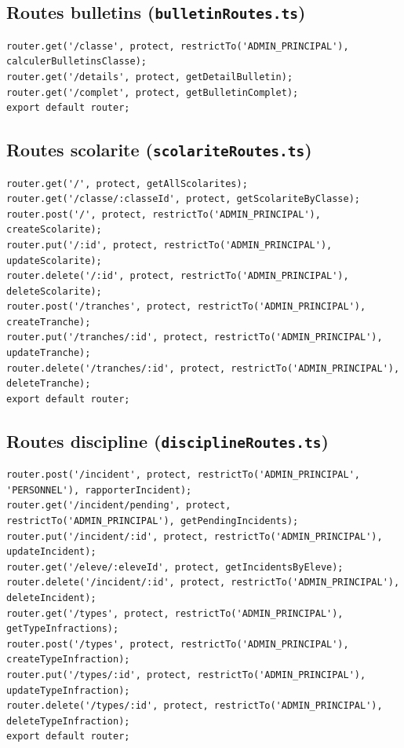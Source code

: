 \documentclass[12pt,a4paper]{article}
\begin{document}
\subsection{Routes bulletins (\texttt{bulletinRoutes.ts})}

\begin{lstlisting}[style=code]
router.get('/classe', protect, restrictTo('ADMIN_PRINCIPAL'), calculerBulletinsClasse);
router.get('/details', protect, getDetailBulletin);
router.get('/complet', protect, getBulletinComplet);
export default router;
\end{lstlisting}

\subsection{Routes scolarite (\texttt{scolariteRoutes.ts})}

\begin{lstlisting}[style=code]
router.get('/', protect, getAllScolarites);
router.get('/classe/:classeId', protect, getScolariteByClasse);
router.post('/', protect, restrictTo('ADMIN_PRINCIPAL'), createScolarite);
router.put('/:id', protect, restrictTo('ADMIN_PRINCIPAL'), updateScolarite);
router.delete('/:id', protect, restrictTo('ADMIN_PRINCIPAL'), deleteScolarite);
router.post('/tranches', protect, restrictTo('ADMIN_PRINCIPAL'), createTranche);
router.put('/tranches/:id', protect, restrictTo('ADMIN_PRINCIPAL'), updateTranche);
router.delete('/tranches/:id', protect, restrictTo('ADMIN_PRINCIPAL'), deleteTranche);
export default router;
\end{lstlisting}

\subsection{Routes discipline (\texttt{disciplineRoutes.ts})}

\begin{lstlisting}[style=code]
router.post('/incident', protect, restrictTo('ADMIN_PRINCIPAL', 'PERSONNEL'), rapporterIncident);
router.get('/incident/pending', protect, restrictTo('ADMIN_PRINCIPAL'), getPendingIncidents);
router.put('/incident/:id', protect, restrictTo('ADMIN_PRINCIPAL'), updateIncident);
router.get('/eleve/:eleveId', protect, getIncidentsByEleve);
router.delete('/incident/:id', protect, restrictTo('ADMIN_PRINCIPAL'), deleteIncident);
router.get('/types', protect, restrictTo('ADMIN_PRINCIPAL'), getTypeInfractions);
router.post('/types', protect, restrictTo('ADMIN_PRINCIPAL'), createTypeInfraction);
router.put('/types/:id', protect, restrictTo('ADMIN_PRINCIPAL'), updateTypeInfraction);
router.delete('/types/:id', protect, restrictTo('ADMIN_PRINCIPAL'), deleteTypeInfraction);
export default router;
\end{lstlisting}
\end{document}
